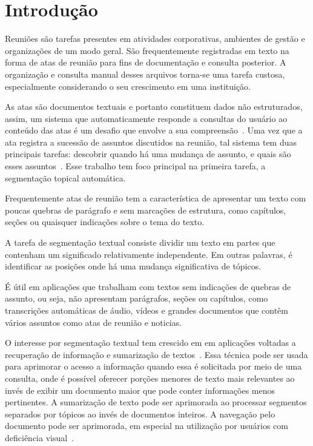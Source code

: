 

\section{Introdução}
	\label{sec:introducao}

Reuniões são tarefas presentes em atividades corporativas, ambientes de gestão e organizações de um modo geral. São frequentemente registradas em texto na forma de atas de reunião para fins de documentação e consulta posterior. A organização e consulta manual desses arquivos torna-se uma tarefa custosa, especialmente considerando o seu crescimento em uma instituição. 

As atas são documentos textuais e portanto constituem dados não estruturados, assim, um sistema que automaticamente responde a consultas do usuário ao conteúdo das atas é um desafio que envolve a sua compreensão~\cite{Bokaei2015}. 
Uma vez que a ata registra a sucessão de assuntos discutidos na reunião, tal sistema tem duas principais tarefas: descobrir quando há uma mudança de assunto, e quais são esses assuntos~\cite{Banerjee2006}. Esse trabalho tem foco principal na primeira tarefa, a segmentação topical automática.


Frequentemente atas de reunião tem a característica de apresentar um texto com poucas quebras de parágrafo e sem marcações de estrutura, como capítulos, seções ou quaisquer indicações sobre o tema do texto. 

A tarefa de segmentação textual consiste dividir um texto em partes que contenham um significado relativamente independente. Em outras palavras, é identificar as posições onde há uma mudança significativa de tópicos.

É útil em aplicações que trabalham com textos sem indicações de quebras de assunto, ou seja, não apresentam parágrafos, seções ou capítulos, como transcrições automáticas de áudio, vídeos e grandes documentos que contêm vários assuntos como atas de reunião e noticias.


O interesse por segmentação textual tem crescido em em aplicações voltadas a recuperação de informação %
e sumarização de textos~\cite{Kern2009}. %
Essa técnica pode ser usada para aprimorar o acesso a informação quando essa é solicitada por meio de uma consulta, onde é possível oferecer porções menores de texto mais relevantes ao invés de exibir um documento maior que pode conter informações menos pertinentes. 
A sumarização de texto pode ser aprimorada ao processar segmentos separados por tópicos ao invés de documentos inteiros. A navegação pelo documento pode ser aprimorada, em especial na utilização por usuários com deficiência visual~\cite{Choi2000}.



